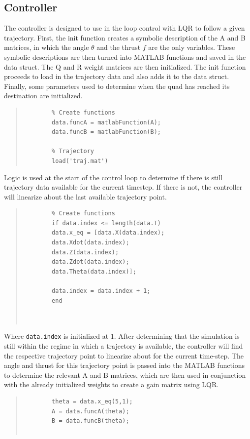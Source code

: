 \documentclass[12pt]{article}
\begin{document}
	\subsection{Controller}
	The controller is designed to use in the loop control with LQR to follow a given trajectory. First, the init function creates a symbolic description of the A and B matrices, in which the angle $\theta$ and the thrust $f$ are the only variables.  These symbolic descriptions are then turned into MATLAB functions and saved in the data struct.  The Q and R weight matrices are then initialized.  The init function proceeds to load in the trajectory data and also adds it to the data struct.  Finally, some parameters used to determine when the quad has reached its destination are initialized.
	\begin{quote}
		\begin{lstlisting}
		% Create functions
		data.funcA = matlabFunction(A);
		data.funcB = matlabFunction(B);
		
		% Trajectory
		load('traj.mat')
		\end{lstlisting}
	\end{quote}
	
	Logic is used at the start of the control loop to determine if there is still trajectory data available for the current timestep.  If there is not, the controller will linearize about the last available trajectory point.
	\begin{quote}
		\begin{lstlisting}
		% Create functions
		if data.index <= length(data.T)
		data.x_eq = [data.X(data.index);
		data.Xdot(data.index);
		data.Z(data.index);
		data.Zdot(data.index);
		data.Theta(data.index)];
		
		data.index = data.index + 1;
		end
		
		
		\end{lstlisting}
	\end{quote}
	Where \lstinline!data.index! is initialized at 1. 
	\newline
	\newline
	After determining that the simulation is still within the regime in which a trajectory is available, the controller will find the respective trajectory point to linearize about for the current time-step.  The angle and thrust for this trajectory point is passed into the MATLAB functions to determine the relevant A and B matrices, which are then used in conjunction with the already initialized weights to create a gain matrix using LQR.
	\begin{quote}
		\begin{lstlisting}
		theta = data.x_eq(5,1);
		A = data.funcA(theta);
		B = data.funcB(theta);
		
		\end{lstlisting}
	\end{quote}
	
\end{document}
